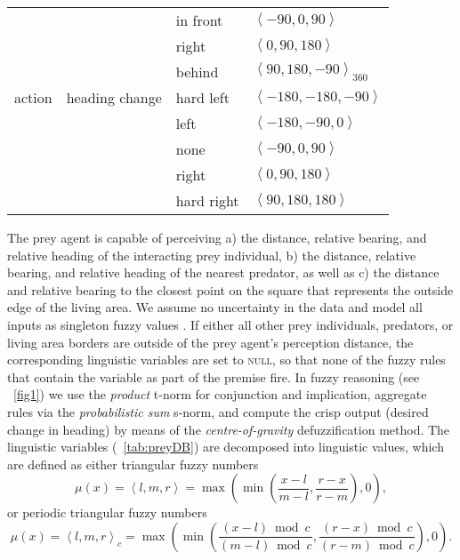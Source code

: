 \begin{table}
\begin{tabular}{lllp{2.7cm}}
    & & in front & $\left<-90,0,90\right>$ \\
    & & right & $\left<0,90,180\right>$ \\
    & & behind & $\left<90,180,-90\right>_{360}$ \\
    \hdashline
    action & heading change & hard left & $\left<-180,-180,-90\right>$ \\
    & & left & $\left<-180,-90,0\right>$ \\
    & & none & $\left<-90,0,90\right>$ \\
    & & right & $\left<0,90,180\right>$ \\
    & & hard right & $\left<90,180,180\right>$ \\
    \bottomrule
  \end{tabular}
\end{table}

The prey agent is capable of perceiving a) the distance, relative bearing, and relative heading of the interacting prey individual, b) the distance, relative bearing, and relative heading of the nearest predator, as well as c) the distance and relative bearing to the closest point on the square that represents the outside edge of the living area. We assume no uncertainty in the data and model all inputs as singleton fuzzy values \cite{mendel2001uncertain}. If either all other prey individuals, predators, or living area borders are outside of the prey agent's perception distance, the corresponding linguistic variables are set to \textsc{null}, so that none of the fuzzy rules that contain the variable as part of the premise fire. In fuzzy reasoning (see \figurename~\ref{fig1}) we use the \emph{product} t-norm for conjunction and implication, aggregate rules via the \emph{probabilistic sum} s-norm, and compute the crisp output (desired change in heading) by means of the \emph{centre-of-gravity} defuzzification method. The linguistic variables (\tablename~\ref{tab:preyDB}) are decomposed into linguistic values, which are defined as either triangular fuzzy numbers
%
\begin{equation}
  \mu(x)=\left<l,m,r\right>=\max{\left(\min\left(\frac{x-l}{m-l}, \frac{r-x}{r-m}\right),0\right)},
\end{equation}
%
or periodic triangular fuzzy numbers
%
\begin{equation}
  \mu(x)=\left<l,m,r\right>_c=\max\left(\min\left(\frac{(x-l) \bmod c}{(m-l) \bmod c}, \frac{(r-x) \bmod c}{(r-m) \bmod c}\right),0\right).
\end{equation}

